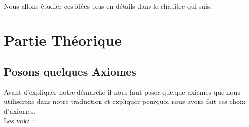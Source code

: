 \documentclass[11pt]{book}
\begin{document}
	\paragraph{}
	Nous allons étudier ces idées plus en détails dans le chapitre qui suis.

\chapter{Partie Théorique}
	\section{Posons quelques Axiomes}
	Avant d'expliquer notre démarche il nous faut poser quelque axiomes que nous utiliserons dans notre traduction et expliquer pourquoi nous avons fait ces choix d'axiomes.\\
	Les voici : \\
\end{document}

